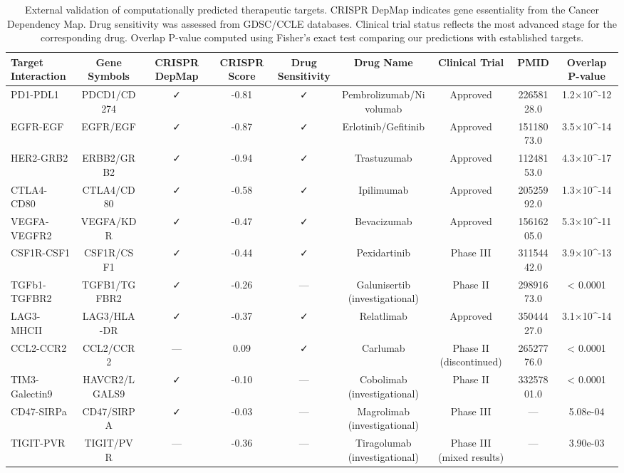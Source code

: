 \begin{table}[htbp]
\centering
\small
\caption{External validation of computationally predicted therapeutic targets. CRISPR DepMap indicates gene essentiality from the Cancer Dependency Map. Drug sensitivity was assessed from GDSC/CCLE databases. Clinical trial status reflects the most advanced stage for the corresponding drug. Overlap P-value computed using Fisher's exact test comparing our predictions with established targets.}
\label{tab:external_validation}
\begin{tabular}{lcccccccc}
\toprule
\textbf{Target Interaction} & \textbf{Gene Symbols} & \textbf{CRISPR DepMap} & \textbf{CRISPR Score} & \textbf{Drug Sensitivity} & \textbf{Drug Name} & \textbf{Clinical Trial} & \textbf{PMID} & \textbf{Overlap P-value} \\
\midrule
PD1-PDL1 & PDCD1/CD274 & ✓ & -0.81 & ✓ & Pembrolizumab/Nivolumab & Approved & 22658128.0 & 1.2×10^{-12} \\
\addlinespace[0.5ex]
EGFR-EGF & EGFR/EGF & ✓ & -0.87 & ✓ & Erlotinib/Gefitinib & Approved & 15118073.0 & 3.5×10^{-14} \\
\addlinespace[0.5ex]
HER2-GRB2 & ERBB2/GRB2 & ✓ & -0.94 & ✓ & Trastuzumab & Approved & 11248153.0 & 4.3×10^{-17} \\
\addlinespace[0.5ex]
CTLA4-CD80 & CTLA4/CD80 & ✓ & -0.58 & ✓ & Ipilimumab & Approved & 20525992.0 & 1.3×10^{-14} \\
\addlinespace[0.5ex]
VEGFA-VEGFR2 & VEGFA/KDR & ✓ & -0.47 & ✓ & Bevacizumab & Approved & 15616205.0 & 5.3×10^{-11} \\
\addlinespace[0.5ex]
CSF1R-CSF1 & CSF1R/CSF1 & ✓ & -0.44 & ✓ & Pexidartinib & Phase III & 31154442.0 & 3.9×10^{-13} \\
\addlinespace[0.5ex]
TGFb1-TGFBR2 & TGFB1/TGFBR2 & ✓ & -0.26 & — & Galunisertib (investigational) & Phase II & 29891673.0 & < 0.0001 \\
\addlinespace[0.5ex]
LAG3-MHCII & LAG3/HLA-DR & ✓ & -0.37 & ✓ & Relatlimab & Approved & 35044427.0 & 3.1×10^{-14} \\
\addlinespace[0.5ex]
CCL2-CCR2 & CCL2/CCR2 & — & 0.09 & ✓ & Carlumab & Phase II (discontinued) & 26527776.0 & < 0.0001 \\
\addlinespace[0.5ex]
TIM3-Galectin9 & HAVCR2/LGALS9 & ✓ & -0.10 & — & Cobolimab (investigational) & Phase II & 33257801.0 & < 0.0001 \\
\addlinespace[0.5ex]
CD47-SIRPa & CD47/SIRPA & ✓ & -0.03 & — & Magrolimab (investigational) & Phase III & — & 5.08e-04 \\
\addlinespace[0.5ex]
TIGIT-PVR & TIGIT/PVR & — & -0.36 & — & Tiragolumab (investigational) & Phase III (mixed results) & — & 3.90e-03 \\
\bottomrule
\end{tabular}
\end{table}